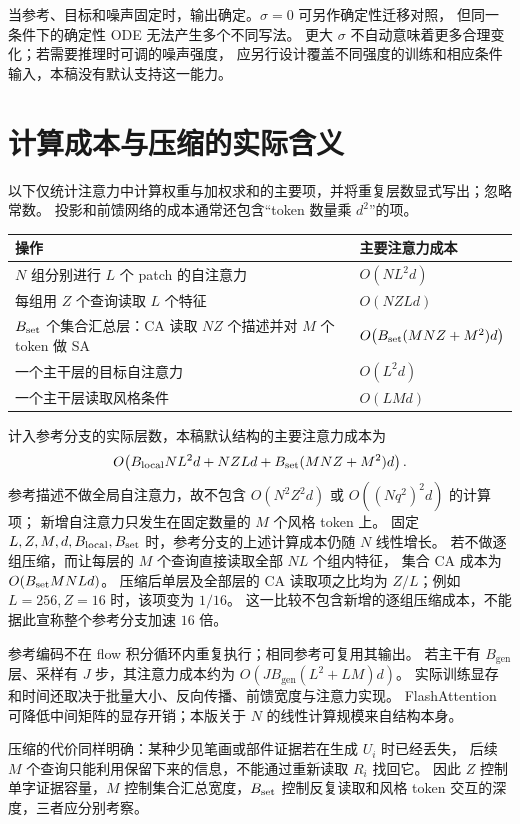 \documentclass[UTF8,fontset=fandol,zihao=5,a4paper]{ctexart}
\begin{document}
当参考、目标和噪声固定时，输出确定。$\sigma=0$ 可另作确定性迁移对照，
但同一条件下的确定性 ODE 无法产生多个不同写法。
更大 $\sigma$ 不自动意味着更多合理变化；若需要推理时可调的噪声强度，
应另行设计覆盖不同强度的训练和相应条件输入，本稿没有默认支持这一能力。

\section{计算成本与压缩的实际含义}

以下仅统计注意力中计算权重与加权求和的主要项，并将重复层数显式写出；忽略常数。
投影和前馈网络的成本通常还包含“token 数量乘 $d^2$”的项。

\begin{center}
\small
\begin{tabularx}{\linewidth}{@{}X l@{}}
\toprule
操作 & 主要注意力成本 \\
\midrule
$N$ 组分别进行 $L$ 个 patch 的自注意力 & $O(NL^2d)$ \\
每组用 $Z$ 个查询读取 $L$ 个特征 & $O(NZLd)$ \\
$B_{\rm set}$ 个集合汇总层：CA 读取 $NZ$ 个描述并对 $M$ 个 token 做 SA
  & $O\!\left(B_{\rm set}(MNZ+M^2)d\right)$ \\
一个主干层的目标自注意力 & $O(L^2d)$ \\
一个主干层读取风格条件 & $O(LMd)$ \\
\bottomrule
\end{tabularx}
\end{center}

计入参考分支的实际层数，本稿默认结构的主要注意力成本为
\[
O\!\left(B_{\mathrm{local}}NL^2d+NZLd
+B_{\rm set}(MNZ+M^2)d\right).
\]
参考描述不做全局自注意力，故不包含 $O(N^2Z^2d)$ 或 $O((Nq^2)^2d)$ 的计算项；
新增自注意力只发生在固定数量的 $M$ 个风格 token 上。
固定 $L,Z,M,d,B_{\rm local},B_{\rm set}$ 时，参考分支的上述计算成本仍随 $N$ 线性增长。
若不做逐组压缩，而让每层的 $M$ 个查询直接读取全部 $NL$ 个组内特征，
集合 CA 成本为 $O(B_{\rm set}MNLd)$。
压缩后单层及全部层的 CA 读取项之比均为 $Z/L$；例如 $L=256,Z=16$ 时，该项变为 $1/16$。
这一比较不包含新增的逐组压缩成本，不能据此宣称整个参考分支加速 $16$ 倍。

参考编码不在 flow 积分循环内重复执行；相同参考可复用其输出。
若主干有 $B_{\mathrm{gen}}$ 层、采样有 $J$ 步，其注意力成本约为
$O(JB_{\mathrm{gen}}(L^2+LM)d)$。
实际训练显存和时间还取决于批量大小、反向传播、前馈宽度与注意力实现。
FlashAttention 可降低中间矩阵的显存开销；本版关于 $N$ 的线性计算规模来自结构本身。

压缩的代价同样明确：某种少见笔画或部件证据若在生成 $U_i$ 时已经丢失，
后续 $M$ 个查询只能利用保留下来的信息，不能通过重新读取 $R_i$ 找回它。
因此 $Z$ 控制单字证据容量，$M$ 控制集合汇总宽度，$B_{\rm set}$ 控制反复读取和风格 token 交互的深度，三者应分别考察。
\end{document}
